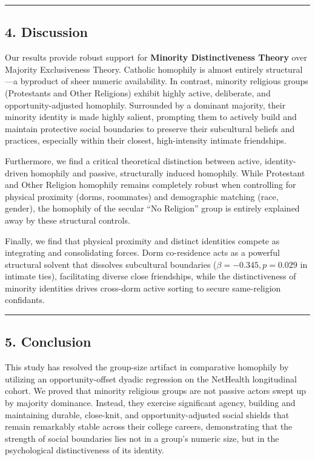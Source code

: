 \documentclass[
  letterpaper,
  DIV=11,
  numbers=noendperiod]{scrartcl}
\begin{document}
\begin{center}\rule{0.5\linewidth}{0.5pt}\end{center}

\subsection{4. Discussion}\label{discussion}

Our results provide robust support for \textbf{Minority Distinctiveness
Theory} over Majority Exclusiveness Theory. Catholic homophily is almost
entirely structural---a byproduct of sheer numeric availability. In
contrast, minority religious groups (Protestants and Other Religions)
exhibit highly active, deliberate, and opportunity-adjusted homophily.
Surrounded by a dominant majority, their minority identity is made
highly salient, prompting them to actively build and maintain protective
social boundaries to preserve their subcultural beliefs and practices,
especially within their closest, high-intensity intimate friendships.

Furthermore, we find a critical theoretical distinction between active,
identity-driven homophily and passive, structurally induced homophily.
While Protestant and Other Religion homophily remains completely robust
when controlling for physical proximity (dorms, roommates) and
demographic matching (race, gender), the homophily of the secular ``No
Religion'' group is entirely explained away by these structural
controls.

Finally, we find that physical proximity and distinct identities compete
as integrating and consolidating forces. Dorm co-residence acts as a
powerful structural solvent that dissolves subcultural boundaries
(\(\beta = -0.345, p = 0.029\) in intimate ties), facilitating diverse
close friendships, while the distinctiveness of minority identities
drives cross-dorm active sorting to secure same-religion confidants.

\begin{center}\rule{0.5\linewidth}{0.5pt}\end{center}

\subsection{5. Conclusion}\label{conclusion}

This study has resolved the group-size artifact in comparative homophily
by utilizing an opportunity-offset dyadic regression on the NetHealth
longitudinal cohort. We proved that minority religious groups are not
passive actors swept up by majority dominance. Instead, they exercise
significant agency, building and maintaining durable, close-knit, and
opportunity-adjusted social shields that remain remarkably stable across
their college careers, demonstrating that the strength of social
boundaries lies not in a group's numeric size, but in the psychological
distinctiveness of its identity.
\end{document}

